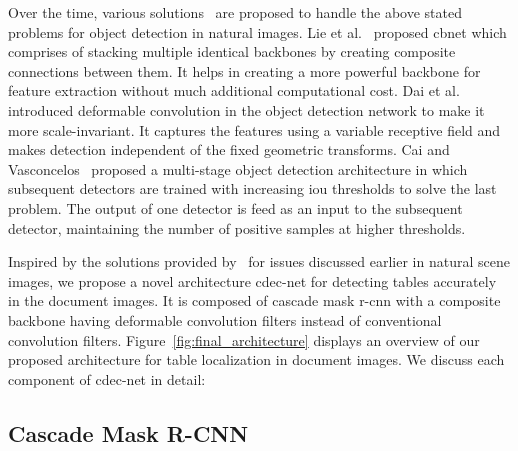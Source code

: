 \documentclass[a4paper,conference]{IEEEtran}
\begin{document}
Over the time, various solutions~\cite{liu2019cbnet,dai2017deformable,cai2019cascade} are proposed to handle the above stated problems for object detection in natural images. Lie et al.~\cite{liu2019cbnet} proposed {\sc cbn}et which comprises of stacking multiple identical backbones by creating composite connections between them. It helps in creating a more powerful backbone for feature extraction without much additional computational cost. Dai et al.~\cite{dai2017deformable} introduced deformable convolution in the object detection network to make it more scale-invariant. It captures the features using a variable receptive field and makes detection independent of the fixed geometric transforms. Cai and Vasconcelos~\cite{cai2019cascade} proposed a multi-stage object detection architecture in which subsequent detectors are trained with increasing {\sc i}o{\sc u} thresholds to solve the last problem. The output of one detector is feed as an input to the subsequent detector, maintaining the number of positive samples at higher thresholds.

Inspired by the solutions provided by~\cite{liu2019cbnet,dai2017deformable,cai2019cascade} for issues discussed earlier in natural scene images, we propose a novel architecture {\sc cd}e{\sc c-n}et for detecting tables accurately in the document images. It is composed of {\sc c}ascade {\sc m}ask {\sc r-cnn} with a composite backbone having deformable convolution filters instead of conventional convolution filters. Figure~\ref{fig:final_architecture} displays an overview of our proposed architecture for table localization in document images. We discuss each component of {\sc cd}e{\sc c-n}et in detail:

\subsection{Cascade Mask R-CNN}
\end{document}
